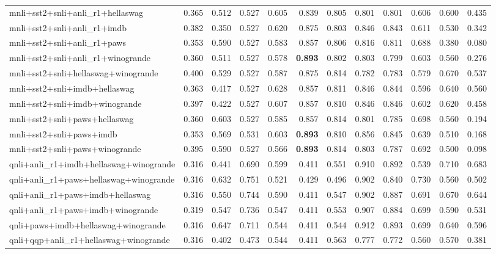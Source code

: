 \begin{table}[t]
\begin{tabular}{lrrrrrrrrrrr}
    mnli+sst2+snli+anli\_r1+hellaswag & 0.365 & 0.512 & 0.527 & 0.605 & 0.839 & 0.805 & 0.801 & 0.801 & 0.606 & 0.600 & 0.435 \\
    mnli+sst2+snli+anli\_r1+imdb & 0.382 & 0.350 & 0.527 & 0.620 & 0.875 & 0.803 & 0.846 & 0.843 & 0.611 & 0.530 & 0.342 \\
    mnli+sst2+snli+anli\_r1+paws & 0.353 & 0.590 & 0.527 & 0.583 & 0.857 & 0.806 & 0.816 & 0.811 & 0.688 & 0.380 & 0.080 \\
    mnli+sst2+snli+anli\_r1+winogrande & 0.360 & 0.511 & 0.527 & 0.578 & \textbf{0.893} & 0.802 & 0.803 & 0.799 & 0.603 & 0.560 & 0.276 \\
    mnli+sst2+snli+hellaswag+winogrande & 0.400 & 0.529 & 0.527 & 0.587 & 0.875 & 0.814 & 0.782 & 0.783 & 0.579 & 0.670 & 0.537 \\
    mnli+sst2+snli+imdb+hellaswag & 0.363 & 0.417 & 0.527 & 0.628 & 0.857 & 0.811 & 0.846 & 0.844 & 0.596 & 0.640 & 0.560 \\
    mnli+sst2+snli+imdb+winogrande & 0.397 & 0.422 & 0.527 & 0.607 & 0.857 & 0.810 & 0.846 & 0.846 & 0.602 & 0.620 & 0.458 \\
    mnli+sst2+snli+paws+hellaswag & 0.360 & 0.603 & 0.527 & 0.585 & 0.857 & 0.814 & 0.801 & 0.785 & 0.698 & 0.560 & 0.194 \\
    mnli+sst2+snli+paws+imdb & 0.353 & 0.569 & 0.531 & 0.603 & \textbf{0.893} & 0.810 & 0.856 & 0.845 & 0.639 & 0.510 & 0.168 \\
    mnli+sst2+snli+paws+winogrande & 0.395 & 0.590 & 0.527 & 0.566 & \textbf{0.893} & 0.814 & 0.803 & 0.787 & 0.692 & 0.500 & 0.098 \\
    qnli+anli\_r1+imdb+hellaswag+winogrande & 0.316 & 0.441 & 0.690 & 0.599 & 0.411 & 0.551 & 0.910 & 0.892 & 0.539 & 0.710 & 0.683 \\
    qnli+anli\_r1+paws+hellaswag+winogrande & 0.316 & 0.632 & 0.751 & 0.521 & 0.429 & 0.496 & 0.902 & 0.840 & 0.730 & 0.560 & 0.502 \\
    qnli+anli\_r1+paws+imdb+hellaswag & 0.316 & 0.550 & 0.744 & 0.590 & 0.411 & 0.547 & 0.902 & 0.887 & 0.691 & 0.670 & 0.644 \\
    qnli+anli\_r1+paws+imdb+winogrande & 0.319 & 0.547 & 0.736 & 0.547 & 0.411 & 0.553 & 0.907 & 0.884 & 0.699 & 0.590 & 0.531 \\
    qnli+paws+imdb+hellaswag+winogrande & 0.316 & 0.647 & 0.711 & 0.544 & 0.411 & 0.544 & 0.912 & 0.893 & 0.699 & 0.640 & 0.596 \\
    qnli+qqp+anli\_r1+hellaswag+winogrande & 0.316 & 0.402 & 0.473 & 0.544 & 0.411 & 0.563 & 0.777 & 0.772 & 0.560 & 0.570 & 0.381 \\

\end{tabular}
\end{table}
